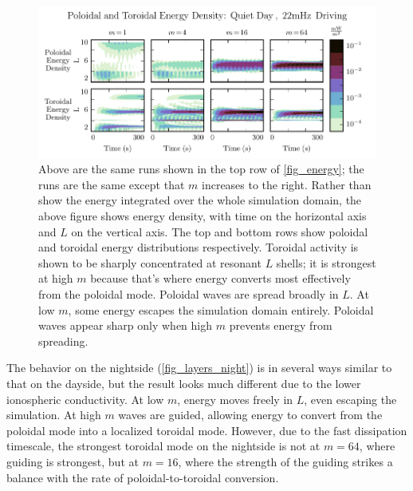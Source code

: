 \documentclass[draft,linenumbers]{agujournal}
\begin{document}
\begin{figure}
    \begin{center}
    \includegraphics[width=\textwidth]{figures/fig_layers_day.pdf}
    \caption{
        Above are the same runs shown in the top row of \cref{fig_energy}; the runs are the same except that $m$ increases to the right. Rather than show the energy integrated over the whole simulation domain, the above figure shows energy density, with time on the horizontal axis and $L$ on the vertical axis. The top and bottom rows show poloidal and toroidal energy distributions respectively. Toroidal activity is shown to be sharply concentrated at resonant $L$ shells; it is strongest at high $m$ because that's where energy converts most effectively from the poloidal mode. Poloidal waves are spread broadly in $L$. At low $m$, some energy escapes the simulation domain entirely. Poloidal waves appear sharp only when high $m$ prevents energy from spreading.
    }
    \label{fig_layers_day}
    \end{center}
\end{figure}


The behavior on the nightside (\cref{fig_layers_night}) is in several ways similar to that on the dayside, but the result looks much different due to the lower ionospheric conductivity. At low $m$, energy moves freely in $L$, even escaping the simulation. At high $m$ waves are guided, allowing energy to convert from the poloidal mode into a localized toroidal mode. However, due to the fast dissipation timescale, the strongest toroidal mode on the nightside is not at $m = 64$, where guiding is strongest, but at $m = 16$, where the strength of the guiding strikes a balance with the rate of poloidal-to-toroidal conversion.
\end{document}
